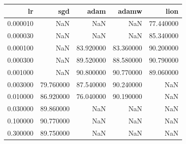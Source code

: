 \begin{tabular}{rrrrr}
\toprule
lr & sgd & adam & adamw & lion \\
\midrule
0.000010 & NaN & NaN & NaN & 77.440000 \\
0.000030 & NaN & NaN & NaN & 85.340000 \\
0.000100 & NaN & 83.920000 & 83.360000 & 90.200000 \\
0.000300 & NaN & 89.520000 & 88.580000 & 90.790000 \\
0.001000 & NaN & 90.800000 & 90.770000 & 89.060000 \\
0.003000 & 79.760000 & 87.540000 & 90.240000 & NaN \\
0.010000 & 86.920000 & 76.040000 & 90.190000 & NaN \\
0.030000 & 89.860000 & NaN & NaN & NaN \\
0.100000 & 90.770000 & NaN & NaN & NaN \\
0.300000 & 89.750000 & NaN & NaN & NaN \\
\bottomrule
\end{tabular}
